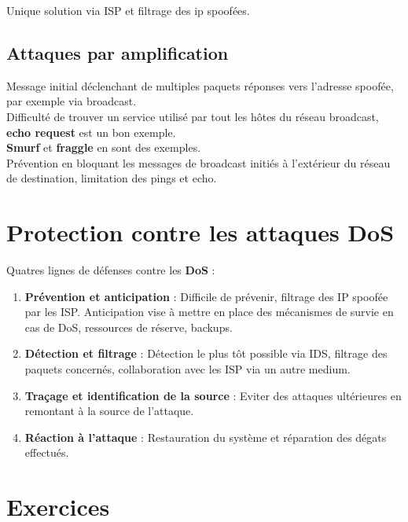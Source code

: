 \documentclass{report}
\begin{document}
			Unique solution via ISP et filtrage des ip spoofées.\\

		\subsection{Attaques par amplification}

			Message initial déclenchant de multiples paquets réponses vers l'adresse spoofée, par exemple via broadcast.\\  
			Difficulté de trouver un service utilisé par tout les hôtes du réseau broadcast, \textbf{echo request} est un bon exemple.\\
			\textbf{Smurf} et \textbf{fraggle} en sont des exemples.\\

			Prévention en bloquant les messages de broadcast initiés à l'extérieur du réseau de destination, limitation des pings et echo.\\

	\section{Protection contre les attaques DoS}

		Quatres lignes de défenses contre les \textbf{DoS} : \\

		\begin{enumerate}
			\item \textbf{Prévention et anticipation} : Difficile de prévenir, filtrage des IP spoofée par les ISP. Anticipation vise à mettre en place des mécanismes de survie en cas de DoS, ressources de réserve, backups.\\
			\item \textbf{Détection et filtrage} : Détection le plus tôt possible via IDS, filtrage des paquets concernés, collaboration avec les ISP via un autre medium.\\
			\item \textbf{Traçage et identification de la source} : Eviter des attaques ultérieures en remontant à la source de l'attaque.\\
			\item \textbf{Réaction à l'attaque} : Restauration du système et réparation des dégats effectués.\\ 
		\end{enumerate}
	
	\section{Exercices}
\end{document}

